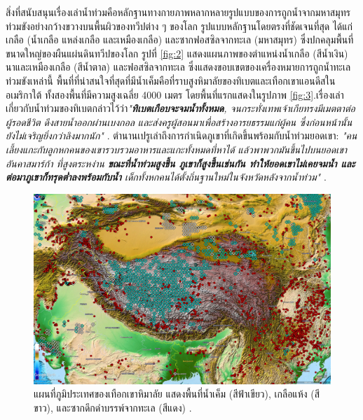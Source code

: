 \documentclass[10pt,twocolumn,letterpaper]{article}
\begin{document}
สิ่งที่สนับสนุนเรื่องเล่าน้ำท่วมคือหลักฐานทางกายภาพหลากหลายรูปแบบของการถูกน้ำจากมหาสมุทรท่วมขังอย่างกว้างขวางบนพื้นผิวของทวีปต่าง ๆ ของโลก รูปแบบหลักฐานโดยตรงที่ชัดเจนที่สุด ได้แก่ เกลือ (น้ำเกลือ แหล่งเกลือ และเหมืองเกลือ) และซากฟอสซิลจากทะเล (มหาสมุทร) ซึ่งปกคลุมพื้นที่ขนาดใหญ่ของผืนแผ่นดินทวีปของโลก รูปที่ \ref{fig:2} แสดงแผนภาพของตำแหน่งน้ำเกลือ (สีน้ำเงิน) นาและเหมืองเกลือ (สีน้ำตาล) และฟอสซิลจากทะเล \cite{15,16,86,87} ซึ่งแสดงขอบเขตของเครื่องหมายการถูกน้ำทะเลท่วมขังเหล่านี้
พื้นที่ที่น่าสนใจที่สุดที่มีน้ำเค็มคือที่ราบสูงหิมาลัยของทิเบตและเทือกเขาแอนดีสในอเมริกาใต้ ทั้งสองพื้นที่มีความสูงเฉลี่ย 4000 เมตร โดยพื้นที่แรกแสดงในรูปภาพ  \ref{fig:3}.เรื่องเล่าเกี่ยวกับน้ำท่วมของทิเบตกล่าวไว้ว่า\textit{"\textbf{ทิเบตเกือบจะจมน้ำทั้งหมด}, จนกระทั่งเทพเจ้าเกียทรงมีเมตตาต่อผู้รอดชีวิต ดึงสายน้ำออกผ่านเบงกอล และส่งครูผู้สอนมาเพื่อสร้างอารยธรรมแก่ผู้คน  ซึ่งก่อนหน้านั้นยังไม่เจริญยิ่งกว่าลิงมากนัก"} \cite{3}. ตำนานเปรูเล่าถึงการกำเนิดภูเขาที่เกิดขึ้นพร้อมกับน้ำท่วมยอดเขา: \textit{"คนเลี้ยงแกะกับลูกหกคนของเขารวบรวมอาหารและแกะทั้งหมดที่หาได้ แล้วพาพวกมันขึ้นไปบนยอดเขา 
อันคาสมาร์ก้า ที่สูงตระหง่าน \textbf{ขณะที่น้ำท่วมสูงขึ้น ภูเขาก็สูงขึ้นเช่นกัน ทำให้ยอดเขาไม่เคยจมน้ำ และต่อมาภูเขาก็ทรุดต่ำลงพร้อมกับน้ำ} เด็กทั้งหกคนได้ตั้งถิ่นฐานใหม่ในจังหวัดหลังจากน้ำท่วม"} \cite{3}.

\begin{figure}[t]
\begin{center}
   \includegraphics[width=1\linewidth]{tibet.jpg}
\end{center}
   \caption{แผนที่ภูมิประเทศของเทือกเขาหิมาลัย แสดงพื้นที่น้ำเค็ม (สีฟ้าเขียว), เกลือแห้ง (สีขาว), และซากดึกดำบรรพ์จากทะเล (สีแดง) \cite{15,16,86,87}.}
\label{fig:3}
\label{fig:onecol}
\end{figure}
\end{document}
